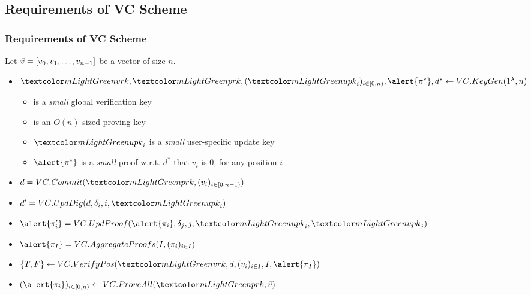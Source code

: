 \subsection{Requirements of VC Scheme}
\begin{frame}
    \frametitle{Requirements of VC Scheme}

    Let $\vec{{v}}=[v_0, v_1, \dots, v_{n-1}]$ be a vector of size $n$.\pause

    \begin{itemize}
        \item $\vrk,\prk,(\upk_i)_{i\in[0,n)},\alert{\pi^*}, d^* \leftarrow \vcsetup(1^\lambda, n)$\pause
        \begin{itemize}
            \item \vrk is a \textit{small} global \alert{verification key}\pause
            \item \prk is an $O(n)$-sized \alert{proving key}\pause
            \item $\upk_i$ is a \textit{small} user-specific \alert{update key}\pause
            \item $\alert{\pi^*}$ is a \textit{small} proof w.r.t. $d^*$ that $v_i$ is 0, for any position $i$\pause
        \end{itemize}
        \item $d=\vccommit(\prk,(v_i)_{i\in [0,n-1)})$\pause
        \item $d'=\vccommupdate(d, \delta_i, i, \upk_i)$\pause
        \item $\alert{\pi_i'} = \vcproofupdate(\alert{\pi_i}, \delta_j, j, \upk_i, \upk_j)$\pause
        \item $\alert{\pi_I} = \vcaggregateproofs(I, (\pi_i)_{i\in I})$\pause
        \item $\{T,F\}\leftarrow \vcverifypos(\vrk, d, (v_i)_{i\in I}, I, \alert{\pi_I})$\pause
        \item $(\alert{\pi_i})_{i\in[0,n)} \leftarrow \vcopenall(\prk, \vect{v})$\pause
    \end{itemize}
\end{frame}